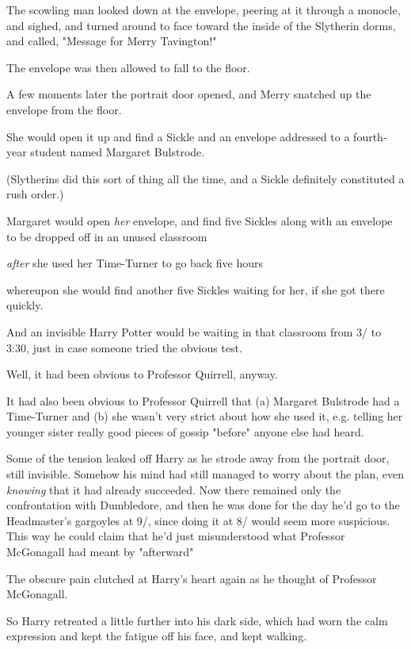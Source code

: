 The scowling man looked down at the envelope, peering at it through a monocle,
and sighed, and turned around to face toward the inside of the Slytherin dorms,
and called, "Message for Merry Tavington!"

The envelope was then allowed to fall to the floor.

A few moments later the portrait door opened, and Merry snatched up the
envelope from the floor.

She would open it up and find a Sickle and an envelope addressed to a
fourth-year student named Margaret Bulstrode.

(Slytherins did this sort of thing all the time, and a Sickle definitely
constituted a rush order.)

Margaret would open \emph{her} envelope, and find five Sickles along with an
envelope to be dropped off in an unused classroom{\el}

{\el} \emph{after} she used her Time-Turner to go back five hours{\el}

{\el} whereupon she would find another five Sickles waiting for her, if she
got there quickly.

And an invisible Harry Potter would be waiting in that classroom from 3\PM/
to 3:30, just in case someone tried the obvious test.

Well, it had been obvious to Professor Quirrell, anyway.

It had also been obvious to Professor Quirrell that (a) Margaret Bulstrode had
a Time-Turner and (b) she wasn't very strict about how she used it, e.g.
telling her younger sister really good pieces of gossip "before" anyone else
had heard.

Some of the tension leaked off Harry as he strode away from the portrait door,
still invisible. Somehow his mind had still managed to worry about the plan,
even \emph{knowing} that it had already succeeded. Now there remained only the
confrontation with Dumbledore, and then he was done for the day{\el} he'd go
to the Headmaster's gargoyles at 9\PM/, since doing it at 8\PM/ would seem more
suspicious. This way he could claim that he'd just misunderstood what Professor
McGonagall had meant by "afterward"{\el}

The obscure pain clutched at Harry's heart again as he thought of Professor
McGonagall.

So Harry retreated a little further into his dark side, which had worn the calm
expression and kept the fatigue off his face, and kept walking.

